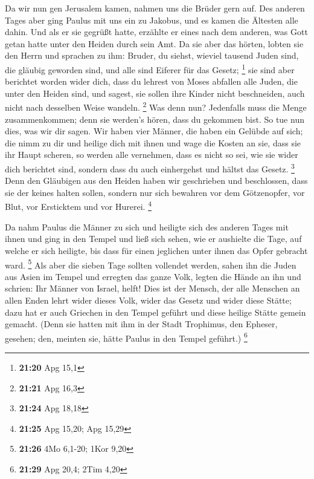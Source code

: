  Da wir nun gen Jerusalem kamen, nahmen uns die Brüder gern
auf.  Des anderen Tages aber ging Paulus mit uns ein zu
Jakobus, und es kamen die Ältesten alle dahin.  Und als er
sie gegrüßt hatte, erzählte er eines nach dem anderen, was Gott getan
hatte unter den Heiden durch sein Amt.  Da sie aber das
hörten, lobten sie den Herrn und sprachen zu ihm: Bruder, du siehst,
wieviel tausend Juden sind, die gläubig geworden sind, und alle sind
Eiferer für das Gesetz; \footnote{\textbf{21:20} Apg 15,1} 
sie sind aber berichtet worden wider dich, dass du lehrest von Moses
abfallen alle Juden, die unter den Heiden sind, und sagest, sie sollen
ihre Kinder nicht beschneiden, auch nicht nach desselben Weise wandeln.
\footnote{\textbf{21:21} Apg 16,3}  Was denn nun?
Jedenfalls muss die Menge zusammenkommen; denn sie werden's hören, dass
du gekommen bist.  So tue nun dies, was wir dir sagen.
 Wir haben vier Männer, die haben ein Gelübde auf sich; die
nimm zu dir und heilige dich mit ihnen und wage die Kosten an sie, dass
sie ihr Haupt scheren, so werden alle vernehmen, dass es nicht so sei,
wie sie wider dich berichtet sind, sondern dass du auch einhergehst und
hältst das Gesetz. \footnote{\textbf{21:24} Apg 18,18} 
Denn den Gläubigen aus den Heiden haben wir geschrieben und beschlossen,
dass sie der keines halten sollen, sondern nur sich bewahren vor dem
Götzenopfer, vor Blut, vor Ersticktem und vor Hurerei. \footnote{\textbf{21:25}
  Apg 15,20; Apg 15,29}

 Da nahm Paulus die Männer zu sich und heiligte sich des
anderen Tages mit ihnen und ging in den Tempel und ließ sich sehen, wie
er aushielte die Tage, auf welche er sich heiligte, bis dass für einen
jeglichen unter ihnen das Opfer gebracht ward. \footnote{\textbf{21:26}
  4Mo 6,1-20; 1Kor 9,20}  Als aber die sieben Tage sollten
vollendet werden, sahen ihn die Juden aus Asien im Tempel und erregten
das ganze Volk, legten die Hände an ihn und schrien:  Ihr
Männer von Israel, helft! Dies ist der Mensch, der alle Menschen an
allen Enden lehrt wider dieses Volk, wider das Gesetz und wider diese
Stätte; dazu hat er auch Griechen in den Tempel geführt und diese
heilige Stätte gemein gemacht.  (Denn sie hatten mit ihm in
der Stadt Trophimus, den Epheser, gesehen; den, meinten sie, hätte
Paulus in den Tempel geführt.) \footnote{\textbf{21:29} Apg 20,4; 2Tim
  4,20}

